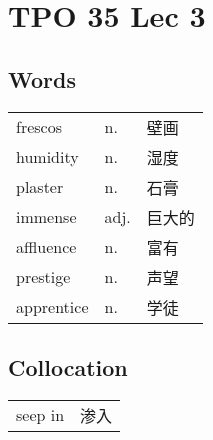 \section{TPO 35 Lec 3}

\subsection{Words}

\begin{tabular}{lll}
    frescos    & n.   & 壁画  \\
    humidity   & n.   & 湿度  \\
    plaster    & n.   & 石膏  \\
    immense    & adj. & 巨大的 \\
    affluence  & n.   & 富有  \\
    prestige   & n.   & 声望  \\
    apprentice & n.   & 学徒  \\
\end{tabular}

\subsection{Collocation}

\begin{tabular}{ll}
    seep in & 渗入 \\
\end{tabular}

